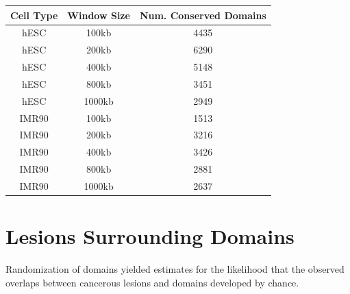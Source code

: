 \begin{table}
  \centering\label{tab:conservedDomains}
  \begin{tabularx}{\textwidth}{@{}ccc@{}}
    \toprule
    Cell Type & Window Size & Num. Conserved Domains \\
    \midrule
     hESC  & 100kb  & 4435 \\
     hESC  & 200kb  & 6290 \\
     hESC  & 400kb  & 5148 \\
     hESC  & 800kb  & 3451 \\
     hESC  & 1000kb & 2949 \\
     IMR90 & 100kb  & 1513 \\
     IMR90 & 200kb  & 3216 \\
     IMR90 & 400kb  & 3426 \\
     IMR90 & 800kb  & 2881 \\
     IMR90 & 1000kb & 2637 \\
    \bottomrule
  \end{tabularx}
\end{table}

\section*{Lesions Surrounding Domains}

Randomization of domains yielded estimates for the likelihood that the observed overlaps between cancerous lesions and domains
developed by chance.
